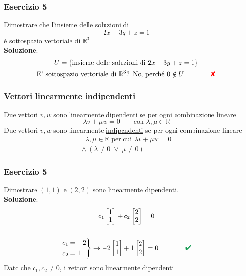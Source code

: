 \documentclass[italian]{article}
\newcommand{\crossmark}{\textcolor{red}{\text{$\qquad$\ding{56}}}}
\renewcommand{\checkmark}{\textcolor{ForestGreen}{\text{$\qquad$\ding{52}}}}
\newcommand{\ins}[1]{\text{$\mathbb{#1}$}}
\begin{document}
\subsubsection{Esercizio 5}
Dimostrare che l'insieme delle soluzioni di
\[
	2x-3y+z = 1
\]
è sottospazio vettoriale di $\ins{R}^3$\\[2mm]
\textbf{Soluzione}:
\begin{gather*}
	U =  \{ \text{insieme delle soluzioni di } 2x-3y+z = 1 \}\\
	\text{E' sottospazio vettoriale di }\ins{R}^3 \text{? }
	\text{No, perché } 0 \notin U \qquad \crossmark
\end{gather*}

\subsubsection{Vettori linearmente indipendenti}
Due vettori $v,w$ sono linearmente \underline{dipendenti} se per ogni combinazione lineare
\[
	\lambda v + \mu w = 0 \qquad \text{con } \lambda,\mu \in \ins{R}
\]
Due vettori $v,w$ sono linearmente \underline{indipendenti} se per ogni combinazione lineare
\begin{gather*}
	\exists \lambda,\mu \in \ins{R} \text{ per cui }\lambda v + \mu w = 0	\\
	\land \; (\lambda \neq 0 \; \lor \; \mu \neq 0)
\end{gather*}

\subsubsection{Esercizio 5}
Dimostrare $(1,1)$ e $(2,2)$ sono linearmente dipendenti.\\[2mm]
\textbf{Soluzione}:
\begin{gather*}
	c_1 
	\begin{bmatrix}
		 1 \\ 1
	\end{bmatrix}
	+
	c_2
	\begin{bmatrix}
		2 \\ 2
	\end{bmatrix}
	= 0\\\\
	\begin{rcases*}
		c_1 = -2\\
		c_2 = 1
	\end{rcases*}
	\to
	-2
	\begin{bmatrix}
	1 \\ 1
	\end{bmatrix}
	+
	1
	\begin{bmatrix}
	2 \\ 2
	\end{bmatrix}
	= 0 \qquad \checkmark
\end{gather*}
Dato che $c_1,c_2 \neq 0$, i vettori sono linearmente dipendenti 
\end{document}
